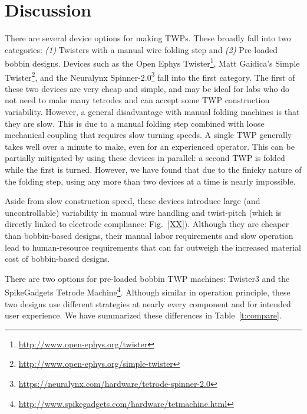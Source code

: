 \documentclass[11pt,a4paper]{article}
\begin{document}
\section{Discussion}
There are several device options for making TWPs. These broadly fall into two
categories: \textit{(1)} Twisters with a manual wire folding step and
\textit{(2)} Pre-loaded bobbin designs. Devices such as the Open Ephys
Twister\footnote{\url{http://www.open-ephys.org/twister}}, Matt Gaidica's
Simple Twister\footnote{\url{http://www.open-ephys.org/simple-twister}}, and
the Neuralynx
Spinner-2.0\footnote{\url{https://neuralynx.com/hardware/tetrode-spinner-2.0}}
fall into the first category. The first of these two devices are very cheap and
simple, and may be ideal for labs who do not need to make many tetrodes and can
accept some TWP construction variability. However, a general disadvantage with manual
folding machines is that they are slow. This is due to a  manual folding step
combined with loose mechanical coupling that requires slow turning speeds.  A
single TWP generally takes well over a minute to make, even for an experienced
operator. This can be partially mitigated by using these devices in
parallel: a second TWP is folded while the first is turned. However, we have
found that due to the finicky nature of the folding step, using any more than
two devices at a time is nearly impossible. 

Aside from slow construction speed, these devices introduce large (and
uncontrollable) variability in manual wire handling and twist-pitch (which is
directly linked to electrode compliance: Fig.~\ref{XX}). Although they are
cheaper than bobbin-based designs, their manual labor requirements and slow
operation lead to human-resource requirements that can far outweigh the
increased material cost of bobbin-based designs. 

There are two options for pre-loaded bobbin TWP machines: Twister3 and the
SpikeGadgets Tetrode
Machine\footnote{\url{http://www.spikegadgets.com/hardware/tetmachine.html}}.
Although similar in operation principle, these two designs use different
strategies at nearly every component and for intended user experience. We have
summarized these differences in Table~\ref{t:compare}.

\setlength{\tabcolsep}{10pt}
\end{document}
